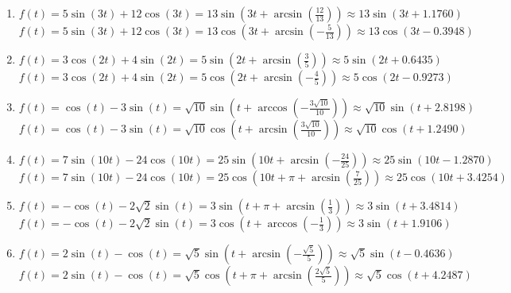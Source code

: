 \documentclass{ximera}
\begin{document}
\begin{enumerate}

\setcounter{enumi}{\value{HW}}

\item $f(t) = 5\sin(3t) + 12\cos(3t) = 13\sin\left(3t + \arcsin\left(\frac{12}{13}\right)\right) \approx 13\sin(3t + 1.1760)$ \\

$f(t) = 5\sin(3t) + 12\cos(3t) = 13\cos\left(3t + \arcsin\left(-\frac{5}{13}\right)\right) \approx 13\cos(3t -0.3948)$


\item $f(t) = 3\cos(2t) + 4\sin(2t) = 5\sin\left(2t+\arcsin\left(\frac{3}{5}\right) \right) \approx 5\sin(2t+0.6435)$ \\

 $f(t) = 3\cos(2t) + 4\sin(2t) = 5\cos\left(2t+\arcsin\left(-\frac{4}{5}\right) \right) \approx 5\cos(2t-0.9273)$
 
 
\item $f(t) = \cos(t) - 3\sin(t) = \sqrt{10} \sin\left(t + \arccos\left(-\frac{3\sqrt{10}}{10} \right)\right) \approx \sqrt{10} \sin(t + 2.8198)$ \\

$f(t) = \cos(t) - 3\sin(t) = \sqrt{10} \cos\left(t + \arcsin\left(\frac{3\sqrt{10}}{10} \right)\right) \approx \sqrt{10} \cos(t + 1.2490)$
 
 
\item  $f(t) = 7\sin(10t) - 24\cos(10t) = 25\sin\left( 10t + \arcsin\left(-\frac{24}{25}\right)\right) \approx 25 \sin(10t-1.2870)$ \\

$f(t) = 7\sin(10t) - 24\cos(10t) = 25\cos\left( 10t + \pi + \arcsin\left(\frac{7}{25}\right)\right) \approx 25 \cos(10t+3.4254)$


\item  $f(t) = -\cos(t) - 2\sqrt{2} \sin(t) = 3\sin\left(t+\pi + \arcsin\left(\frac{1}{3}\right)\right) \approx 3\sin(t+3.4814)$ \\


$f(t) = -\cos(t) - 2\sqrt{2} \sin(t) = 3\cos\left(t+ \arccos\left(-\frac{1}{3}\right)\right) \approx 3\sin(t+1.9106)$


\item $f(t) = 2\sin(t) - \cos(t) = \sqrt{5}\sin\left(t  + \arcsin\left(-\frac{\sqrt{5}}{5}\right)\right) \approx \sqrt{5}\sin(t -0.4636)$ \\

$f(t) = 2\sin(t) - \cos(t) = \sqrt{5}\cos\left(t  + \pi + \arcsin\left(\frac{2\sqrt{5}}{5}\right)\right) \approx \sqrt{5}\cos(t + 4.2487)$

\setcounter{HW}{\value{enumi}}

\end{enumerate}
\end{document}
